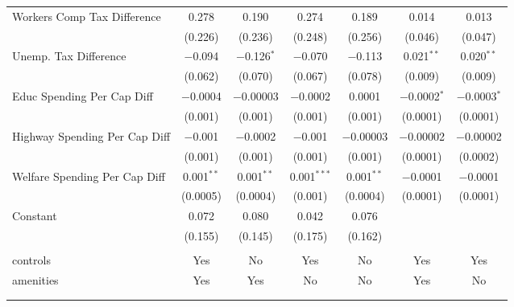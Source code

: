 \begin{table}[!htbp]
\begin{tabular}{@{\extracolsep{5pt}}lcccccc}
  Workers Comp Tax Difference & 0.278 & 0.190 & 0.274 & 0.189 & 0.014 & 0.013 \\ 
  & (0.226) & (0.236) & (0.248) & (0.256) & (0.046) & (0.047) \\ 
  Unemp. Tax Difference & $-$0.094 & $-$0.126$^{*}$ & $-$0.070 & $-$0.113 & 0.021$^{**}$ & 0.020$^{**}$ \\ 
  & (0.062) & (0.070) & (0.067) & (0.078) & (0.009) & (0.009) \\ 
  Educ Spending Per Cap Diff & $-$0.0004 & $-$0.00003 & $-$0.0002 & 0.0001 & $-$0.0002$^{*}$ & $-$0.0003$^{*}$ \\ 
  & (0.001) & (0.001) & (0.001) & (0.001) & (0.0001) & (0.0001) \\ 
  Highway Spending Per Cap Diff & $-$0.001 & $-$0.0002 & $-$0.001 & $-$0.00003 & $-$0.00002 & $-$0.00002 \\ 
  & (0.001) & (0.001) & (0.001) & (0.001) & (0.0001) & (0.0002) \\ 
  Welfare Spending Per Cap Diff & 0.001$^{**}$ & 0.001$^{**}$ & 0.001$^{***}$ & 0.001$^{**}$ & $-$0.0001 & $-$0.0001 \\ 
  & (0.0005) & (0.0004) & (0.001) & (0.0004) & (0.0001) & (0.0001) \\ 
  Constant & 0.072 & 0.080 & 0.042 & 0.076 &  &  \\ 
  & (0.155) & (0.145) & (0.175) & (0.162) &  &  \\ 
 \hline \\[-1.8ex] 
controls & Yes & No & Yes & No & Yes & Yes \\ 
amenities & Yes & Yes & No & No & Yes & No \\ 
\hline \\[-1.8ex] 
\hline 
\hline \\[-1.8ex] 
\end{tabular} 
\end{table} 
